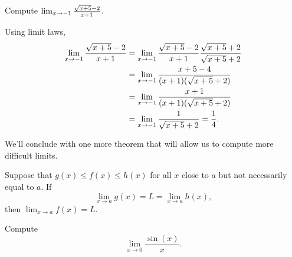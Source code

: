 \begin{example}
Compute $\lim_{x\to-1} {\sqrt{x+5}-2\over x+1}$.
\end{example}
\begin{solution} 
Using limit laws,
\begin{align*}
\lim_{x\to-1} {\sqrt{x+5}-2\over x+1}&=
\lim_{x\to-1} {\sqrt{x+5}-2\over x+1}{\sqrt{x+5}+2\over \sqrt{x+5}+2} \\
&=\lim_{x\to-1} {x+5-4\over (x+1)(\sqrt{x+5}+2)} \\
&=\lim_{x\to-1} {x+1\over (x+1)(\sqrt{x+5}+2)} \\
&=\lim_{x\to-1} {1\over \sqrt{x+5}+2}={1\over4}.
\end{align*}
\end{solution}


We'll conclude with one more theorem that will allow us to compute
more difficult limits.

\begin{mainTheorem}\label{theorem:squeeze}
Suppose that $g(x) \le f(x) \le h(x)$ for all $x$
close to $a$ but not necessarily equal to $a$. If 
\[
\lim_{x\to a} g(x) = L = \lim_{x\to a} h(x),
\] 
then $\lim_{x\to a} f(x) = L$.
\end{mainTheorem}

\begin{example}
Compute
\[
\lim_{x\to 0} \frac{\sin(x)}{x}.
\]
\end{example}

